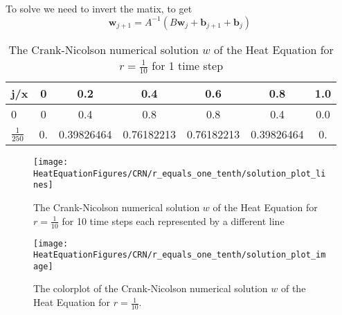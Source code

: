 \begin{example}
To solve we need to invert the matix, to get
\[ \mathbf{w}_{j+1}=A^{-1}(B\mathbf{w}_{j} +\mathbf{b}_{j+1}+\mathbf{b}_{j}) \]


\begin{center}
 \begin{table}[H]
 \caption{The Crank-Nicolson numerical solution $w$ of the Heat Equation for $r=\frac{1}{10}$ for 1 time step}
 \centering
\begin{tabular}{l|cccccc}
j/x&0&0.2&0.4&0.6&0.8&1.0\\ \hline
0&0&0.4&0.8&0.8&0.4&0.0\\
$\frac{1}{250}$&
 0.   &       0.39826464  &0.76182213 & 0.76182213 & 0.39826464&  0.
\end{tabular}
\end{table}
\end{center}

\begin{figure}[H]
  \caption{The Crank-Nicolson numerical solution $w$ of the Heat Equation for $r=\frac{1}{10}$ for 10 time steps each represented by a different line}
  \centering
    \texttt{[image: HeatEquationFigures/CRN/r\_equals\_one\_tenth/solution\_plot\_lines]}
\end{figure}


\begin{figure}[H]
  \caption{The colorplot of the Crank-Nicolson numerical solution $w$ of the Heat Equation for $r=\frac{1}{10}$.}
  \centering
    \texttt{[image: HeatEquationFigures/CRN/r\_equals\_one\_tenth/solution\_plot\_image]}
\end{figure}

\end{example}
